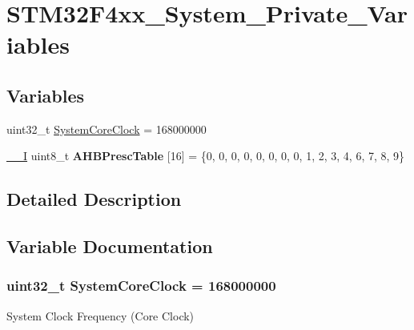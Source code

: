\hypertarget{group___s_t_m32_f4xx___system___private___variables}{}\section{S\+T\+M32\+F4xx\+\_\+\+System\+\_\+\+Private\+\_\+\+Variables}
\label{group___s_t_m32_f4xx___system___private___variables}
\subsection*{Variables}
\begin{DoxyCompactItemize}
\item 
uint32\+\_\+t \hyperlink{group___s_t_m32_f4xx___system___private___variables_gaa3cd3e43291e81e795d642b79b6088e6}{System\+Core\+Clock} = 168000000
\item 
\hyperlink{core__cm4_8h_af63697ed9952cc71e1225efe205f6cd3}{\+\_\+\+\_\+I} uint8\+\_\+t {\bfseries A\+H\+B\+Presc\+Table} \mbox{[}16\mbox{]} = \{0, 0, 0, 0, 0, 0, 0, 0, 1, 2, 3, 4, 6, 7, 8, 9\}\hypertarget{group___s_t_m32_f4xx___system___private___variables_gacdc3ef54c0704c90e69a8a84fb2d970d}{}\label{group___s_t_m32_f4xx___system___private___variables_gacdc3ef54c0704c90e69a8a84fb2d970d}

\end{DoxyCompactItemize}


\subsection{Detailed Description}


\subsection{Variable Documentation}
\subsubsection[{\texorpdfstring{System\+Core\+Clock}{SystemCoreClock}}]{\setlength{\rightskip}{0pt plus 5cm}uint32\+\_\+t System\+Core\+Clock = 168000000}\hypertarget{group___s_t_m32_f4xx___system___private___variables_gaa3cd3e43291e81e795d642b79b6088e6}{}\label{group___s_t_m32_f4xx___system___private___variables_gaa3cd3e43291e81e795d642b79b6088e6}
System Clock Frequency (Core Clock) 